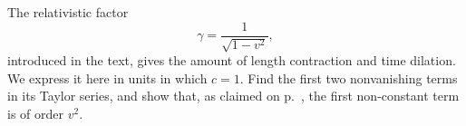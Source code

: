 The relativistic factor
\begin{equation*} 
  \gamma = \frac{1}{\sqrt{1-v^2}},
\end{equation*} 
introduced in the text, gives the amount of length contraction and time dilation.
We express it here in units in which $c=1$. Find the first two nonvanishing terms
in its Taylor series, and show that, as claimed on p.~\pageref{gamma-taylor-claim},
the first non-constant term is of order $v^2$.
